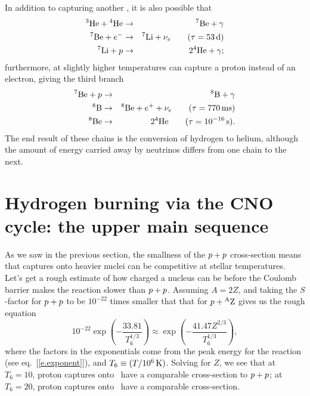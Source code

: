 In addition to capturing another \helium[3], it is also possible that
\begin{eqnarray}
\helium[3] + \helium &\to& \beryllium[7] + \gamma\nonumber\\
 \beryllium[7] + e^{-} &\to& \lithium[7] +  \nu_{e}\qquad(\tau=53\nsp\unitstyle{d})\nonumber \\
 \lithium[7] + \pt &\to& 2\helium + \gamma;
 \end{eqnarray}
furthermore, at slightly higher temperatures \beryllium[7] can capture a proton instead of an electron, giving the third branch
\begin{eqnarray}
\beryllium[7] + \pt &\to& \boron[8] + \gamma\nonumber\\
\boron[8] &\to& \beryllium[8] + e^{+} + \nu_{e}\qquad(\tau = 770\nsp\milli\second)\nonumber\\
\beryllium[8] &\to& 2\helium\qquad(\tau=10^{-16}\nsp\second).
\end{eqnarray}
 The end result of these chains is the conversion of hydrogen to helium, although the amount of energy carried away by neutrinos differs from one chain to the next.

\section[The CNO cycle]{Hydrogen burning via the CNO cycle: the upper main sequence}
\label{s.upper-ms}

As we saw in the previous section, the smallness of the $\pt+\pt$ cross-section means that captures onto heavier nuclei can be competitive at stellar temperatures.  Let's get a rough estimate of how charged a nucleus can be before the Coulomb barrier makes the reaction slower than $\pt+\pt$.  Assuming $A = 2Z$, and taking the $S$-factor for $\pt+\pt$ to be $10^{-22}$ times smaller that that for $\pt + \mathrm{^{A}Z}$ gives us the rough equation
\[ 10^{-22}\exp\left(-\frac{33.81}{T_{6}^{1/3}}\right) \approx \exp\left(-\frac{41.47 Z^{2/3}}{T_{6}^{1/3}}\right), \]
where the factors in the exponentials come from the peak energy for the reaction (see eq.~[\ref{e.exponent}]), and $T_{6}\equiv (T/10^{6}\nsp\K)$.  Solving for $Z$, we see that at $T_{6} = 10$, proton captures onto \carbon\ have a comparable cross-section to $\pt + \pt$; at $T_{6} = 20$, proton captures onto \oxygen\ have a comparable cross-section.

